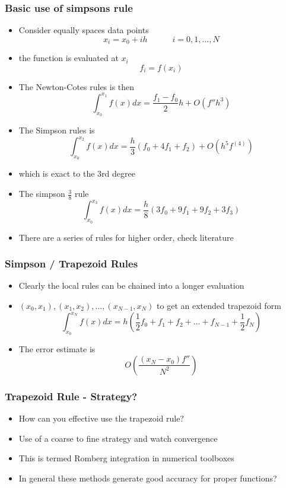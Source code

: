\documentclass[10pt]{beamer}
\begin{document}
\begin{frame}
  \frametitle{Basic use of simpsons rule}
  \begin{itemize}
  \item Consider equally spaces data points
    \[
      x_i = x_0 + i h \mbox{ ~~~~~~~~} i = 0, 1, ..., N
    \]
    
  \item the function is evaluated at $x_i$
    \[
      f_i = f(x_i)
    \]
  \item The Newton-Cotes rules is then
    \[
      \int_{x_0}^{x_1} f(x) dx = \frac{f_1-f_0}{2} h + O(f'' h^3)
    \]
  \item The Simpson rules is
    \[
      \int_{x_0}^{x_2} f(x) dx = \frac{h}{3} (f_0 + 4 f_1 + f_2) + O(h^5 f^{(4)})
    \]
  \item which is exact to the 3rd degree
  \item The simpson $\frac{3}{8}$ rule
    \[
      \int_{x_0}^{x_3} f(x) dx = \frac{h}{8} (3 f_0 + 9 f_1 + 9 f_2 + 3 f_3)
    \]
  \item There are a series of rules for higher order, check literature
  \end{itemize}
\end{frame}

\begin{frame}
  \frametitle{Simpson / Trapezoid Rules}
  \begin{itemize}
  \item Clearly the local rules can be chained into a longer evaluation
  \item $(x_0, x_1), (x_1, x_2), \ldots, (x_{N-1},x_N)$ to get an extended
    trapezoid form
    \[
      \int_{x_0}^{x_N} f(x) dx = h(\frac{1}{2} f_0 + f_1 + f_2 + \ldots + f_{N-1} + \frac{1}{2} f_N )
    \]
  \item The error estimate is
    \[
      O\left( \frac{(x_N - x_0) f''}{N^2} \right)
    \]
  \end{itemize}
\end{frame}

\begin{frame}
  \frametitle{Trapezoid Rule - Strategy?}
  \begin{itemize}
  \item How can you effective use the trapezoid rule?
    \pause
  \item Use of a coarse to fine strategy and watch convergence
  \item This is termed Romberg integration in numerical toolboxes
  \item In general these methods generate good accuracy for proper functions? 
  \end{itemize}
\end{frame}
\end{document}
